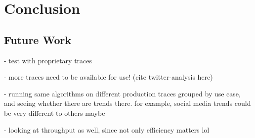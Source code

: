 \chapter{Conclusion}

\section{Future Work}


- test with proprietary traces

- more traces need to be available for use! (cite twitter-analysis here)

- running same algorithms on different production traces grouped by use case, and seeing whether there are trends there. for example, social media trends could be very different to others maybe

- looking at throughput as well, since not only efficiency matters lol